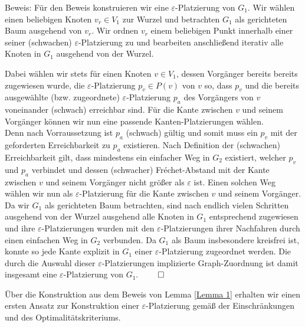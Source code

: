 \documentclass[a4paper, 12pt, twoside]{article}
\theoremstyle{Format1} %
\begin{document}
Beweis:
Für den Beweis konstruieren wir eine $\varepsilon$-Platzierung von $G_1$.
Wir wählen einen beliebigen Knoten $v_r \in V_1$ zur Wurzel und betrachten $G_1$ als gerichteten Baum ausgehend von $v_r$.
Wir ordnen $v_r$ einem beliebigen Punkt innerhalb einer seiner (schwachen) $\varepsilon$-Platzierung zu und bearbeiten anschließend iterativ alle
Knoten in $G_1$ ausgehend von der Wurzel.

Dabei wählen wir stets für einen Knoten $v \in V_1$, dessen Vorgänger bereits bereits zugewiesen wurde,
die $\varepsilon$-Platzierung $p_v \in P(v)$ von $v$ so, dass $p_v$
und die bereits ausgewählte (bzw. zugeordnete) $\varepsilon$-Platzierung $p_a$ des Vorgängers von $v$ voneinander (schwach) erreichbar sind.
Für die Kante zwischen $v$ und seinem Vorgänger können wir nun eine passende Kanten-Platzierungen wählen.
\\
Denn nach Vorraussetzung ist $p_a$ (schwach) gültig und somit muss ein $p_v$ mit der geforderten Erreichbarkeit zu $p_a$ existieren.
Nach Definition der (schwachen) Erreichbarkeit gilt, dass mindestens ein einfacher Weg in $G_2$ existiert, welcher $p_v$ und $p_a$ verbindet
und dessen (schwacher) Fréchet-Abstand mit der Kante zwischen $v$ und seinem Vorgänger nicht größer als $\varepsilon$ ist.
Einen solchen Weg wählen wir nun als $\varepsilon$-Platzierung für die Kante zwischen $v$ und seinem Vorgänger.
\\
Da wir $G_1$ als gerichteten Baum betrachten, sind nach endlich vielen Schritten ausgehend von der Wurzel ausgehend alle Knoten in $G_1$
entsprechend zugewiesen und ihre $\varepsilon$-Platzierungen
wurden mit den $\varepsilon$-Platzierungen ihrer Nachfahren durch einen einfachen Weg in $G_2$ verbunden.
Da $G_1$ als Baum insbesondere kreisfrei ist, konnte so jede Kante explizit in $G_1$ einer $\varepsilon$-Platzierung zugeordnet werden.
Die durch die Auswahl dieser $\varepsilon$-Platzierungen implizierte Graph-Zuordnung ist damit insgesamt eine $\varepsilon$-Platzierung von $G_1$. $\qed$

Über die Konstruktion aus dem Beweis von Lemma \ref{Lemma 1} erhalten wir einen ersten Ansatz zur Konstruktion einer $\varepsilon$-Platzierung gemäß der Einschränkungen und
des Optimalitätskriteriums.
\end{document}

